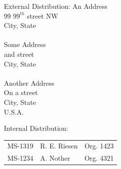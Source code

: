 \documentclass[pdf,ps2pdf,12pt]{smemo}
\begin{document}
\begin{memo}
%
\clearpage
\begin{distribution}{External Distribution:}
    \normalfont
    An Address\\
    99 $99^{th}$ street NW\\
    City, State\\
    \\
    Some Address\\
    and street\\
    City, State\\
    \\
    Another Address\\
    On a street\\
    City, State\\
    U.S.A.
\end{distribution}

\begin{distribution}{Internal Distribution:}
    \normalfont
    \begin{tabular}{@{}lll}
	MS-1319 & R. E. Riesen & Org. 1423\\[3pt]
	MS-1234 & A. Nother & Org. 4321
    \end{tabular}
\end{distribution}

%
\end{memo}
\end{document}
